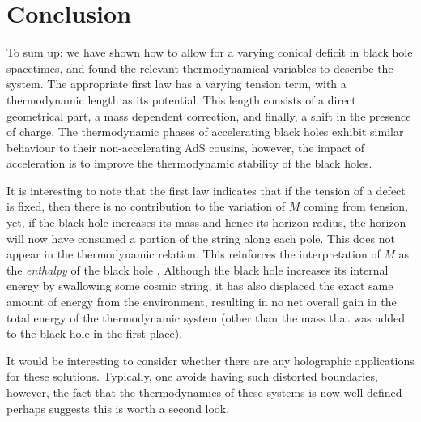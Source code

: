 \documentclass[
twoside,openright,frontopenright]{dmathesis}
\begin{document}
\section{Conclusion}

To sum up: we have shown how to allow for a varying conical deficit
in black hole spacetimes, and found the relevant thermodynamical 
variables to describe the system. The appropriate first law has a 
varying tension term, with a thermodynamic length as its potential. 
This length consists of a direct geometrical part, a mass dependent correction, 
and finally, a shift in the presence of charge. The thermodynamic phases of
accelerating black holes exhibit similar behaviour to their non-accelerating 
AdS cousins, however, the impact of acceleration is to improve the thermodynamic
stability of the black holes.

It is interesting to note that the first law indicates that if the tension of a
defect is fixed, then there is no contribution to the variation of $M$ coming
from tension, yet, if the black hole increases its mass and hence its horizon
radius, the horizon will now have consumed a portion of the string along each
pole.  This does not appear in the thermodynamic relation. This reinforces the
interpretation of $M$ as the {\it enthalpy} of the black hole
\cite{Kastor:2009wy}.  Although the black hole increases its internal energy by
swallowing some cosmic string, it has also displaced the exact same amount of
energy from the environment, resulting in no net overall gain in the total
energy of the thermodynamic system (other than the mass that was added to the
black hole in the first place).

It would be interesting to consider whether there are any holographic
applications for these solutions. Typically, one avoids having such distorted
boundaries, however, the fact that the thermodynamics of these systems is now
well defined perhaps suggests this is worth a second look.
\end{document}
